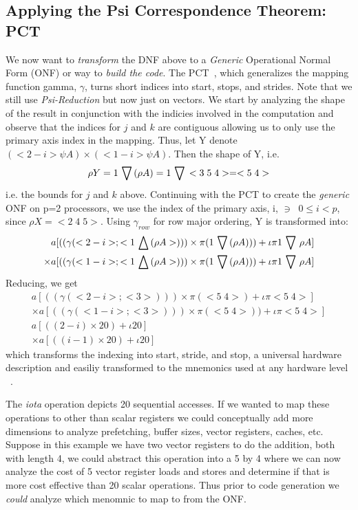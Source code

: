 \subsection* {Applying the Psi Correspondence Theorem: PCT}
We now want to {\em transform} the DNF above to a {\em Generic} Operational Normal Form (ONF) or way 
to {\em build the code}.  The PCT~\cite{muljen94}, which generalizes the mapping function 
gamma, $\gamma$,   turns short indices into start, stops, and strides.
Note that we still use {\em Psi-Reduction} but now just on vectors.  
We start by analyzing the shape of the result in conjunction with the indicies involved
in the computation and observe that the indices for $j$ and $k$ are contiguous allowing
us to only use the primary axis index in the mapping.
Thus, let Y denote $(<2-i> \psi A ) \times ( <1-i> \psi A)$. Then the shape of Y, i.e.
\begin{eqnarray}
\rho Y= 1 \,\bigtriangledown\, (\rho A) = 1 \,\bigtriangledown\, <3\;5\;4> = <5\;4>
\end{eqnarray}
i.e. the bounds for $j$ and $k$  above.
Continuing with the PCT to create the {\em generic} ONF on p=2 processors, we use the index of the primary axis, i, $\ni\;\;0 \leq  i < p$, since $\rho X = <2\;4\;5>$.
Using $\gamma_{row}$ for row major ordering, Y is transformed into:
\small
\begin{eqnarray}
a[ (( \gamma(<2-i >; <1 \,\bigtriangleup\, (\rho A>))) \times \pi ( 1 \,\bigtriangledown\, (\rho A))   )  + \iota \pi 1 \,\bigtriangledown\, \rho A  ] \nonumber \\
\times a[ (( \gamma(<1-i >; <1 \,\bigtriangleup\, (\rho A>))) \times \pi ( 1 \,\bigtriangledown\, (\rho A))   )  + \iota \pi 1 \,\bigtriangledown\, \rho A  ] 
\end{eqnarray}
Reducing, we get
\begin{eqnarray}
a[ (( \gamma(<2-i >; <3>))) \times \pi ( <5\;4>)  + \iota \pi <5\;4> ] \nonumber \\
\times a[ (( \gamma(<1-i >; <3>))) \times \pi ( <5\;4>)   )  + \iota \pi <5\;4>  ]\nonumber \\
a[( (2-i) \times  20)  + \iota 20 ] \nonumber \\
\times a[( (i-1) \times 20 )  + \iota 20 ]
\end{eqnarray}
\normalsize
which transforms the indexing into start, stride, and stop, a universal hardware description and easiliy transformed
to the mnemonics used at any hardware level ~\cite{fftharry}. 

The  {\em iota} operation depicts  20 sequential 
accesses. If we wanted to map these operations to other than  scalar registers
we could conceptually add more dimensions to analyze prefetching, buffer sizes, vector registers, caches, etc.
Suppose in this example we have two vector registers to do the addition, both with length 4, we could
abstract this operation into a 5 by 4 where we can now analyze the cost of 5 vector register loads and
stores and determine if that is more cost effective than 20 scalar operations. Thus prior to code generation we
{\em could} analyze which menomnic to map to from the ONF. 
